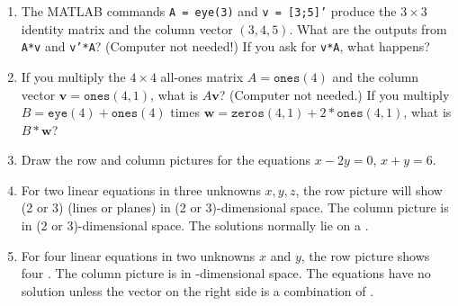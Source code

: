 \documentclass[14pt, a4paper]{article}
\begin{document}
\begin{enumerate}[resume]
    \item The \textcolor{blue!60!white}{MATLAB} commands \texttt{A = eye(3)} and \texttt{v = [3;5]'} produce the $3 \times 3$ identity matrix and the column vector $(3,4,5)$. What are the outputs from \texttt{A*v} and \texttt{v'*A}? (Computer not needed!) If you ask for \texttt{v*A}, what happens?

    \item If you multiply the $4 \times 4$ all-ones matrix $A = \texttt{ones}(4)$ and the column vector $\boldsymbol{v} = \texttt{ones}(4,1)$, what is $A\boldsymbol{v}$? (Computer not needed.) If you multiply $B = \texttt{eye}(4) + \texttt{ones}(4)$ times $\boldsymbol{w} = \texttt{zeros}(4,1) + 2*\texttt{ones}(4,1)$, what is $B*\boldsymbol{w}$?

    \item Draw the row and column pictures for the equations $x - 2y = 0$, $x + y = 6$.

    \item For two linear equations in three unknowns $x, y, z$, the row picture will show (2 or 3) (lines or planes) in (2 or 3)-dimensional space. The column picture is in (2 or 3)-dimensional space. The solutions normally lie on a \underline{\hspace{3cm}}.

    \item For four linear equations in two unknowns $x$ and $y$, the row picture shows four \underline{\hspace{3cm}}. The column picture is in \underline{\hspace{3cm}}-dimensional space. The equations have no solution unless the vector on the right side is a combination of \underline{\hspace{3cm}}.


\end{enumerate}
\end{document}
